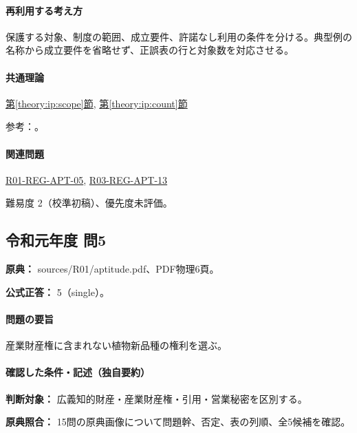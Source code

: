 \paragraph{再利用する考え方} 保護する対象、制度の範囲、成立要件、許諾なし利用の条件を分ける。典型例の名称から成立要件を省略せず、正誤表の行と対象数を対応させる。

\paragraph{共通理論} \hyperref[theory:ip:scope]{第\ref*{theory:ip:scope}節}, \hyperref[theory:ip:count]{第\ref*{theory:ip:count}節}

\par 参考：\cite{ip_industrial_four,ip_broad_scope}。

\paragraph{関連問題} \hyperref[q:r01-reg-apt-05]{R01-REG-APT-05}, \hyperref[q:r03-reg-apt-13]{R03-REG-APT-13}

\par 難易度 2（校準初稿）、優先度未評価。

\subsection{令和元年度 問5}
\label{q:r01-reg-apt-05}

\noindent\textbf{原典：} sources/R01/aptitude.pdf、PDF物理6頁。

\textbf{公式正答：} 5（single）。

\paragraph{問題の要旨} 産業財産権に含まれない植物新品種の権利を選ぶ。

\paragraph{確認した条件・記述（独自要約）}\mbox{}\par

\noindent\textbf{判断対象：} 広義知的財産・産業財産権・引用・営業秘密を区別する。\par

\noindent\textbf{原典照合：} 15問の原典画像について問題幹、否定、表の列順、全5候補を確認。\par

